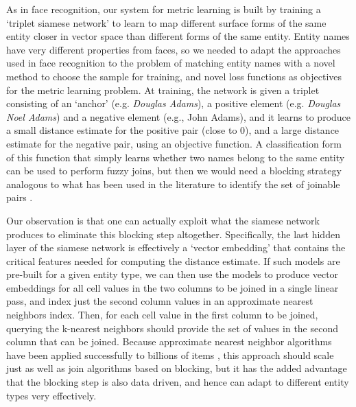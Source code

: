 As in face recognition, our system for metric learning is built by training a `triplet siamese network' to learn to map different surface forms of the same entity closer in vector space than different forms of the same entity.  Entity names have very different properties from faces, so we needed to adapt the approaches used in face recognition to the problem of matching entity names with a novel method to choose the sample for training, and novel loss functions as objectives for the metric learning problem.  At training, the network is given a triplet consisting of an `anchor' (e.g. \textit{Douglas Adams}), a positive element (e.g. \textit{Douglas Noel Adams}) and a negative element (e.g., John Adams), and it learns to produce a small distance estimate for the positive pair (close to 0), and a large distance estimate for the negative pair, using an objective function. A classification form of this function that simply learns whether two names belong to the same entity can be used to perform fuzzy joins, but then we would need a blocking strategy analogous to what has been used in the literature to identify the set of joinable pairs \cite{auto-join-joining-tables-leveraging-transformations}.  

Our observation is that one can actually exploit what the siamese network produces to eliminate this blocking step altogether.  Specifically, the last hidden layer of the siamese network is effectively a `vector embedding' that contains the critical features needed for computing the distance estimate.  If such models are pre-built for a given entity type, we can then use the models to produce vector embeddings for all cell values in the two columns to be joined in a single linear pass, and index just the second column values in an approximate nearest neighbors index.  Then, for each cell value in the first column to be joined, querying the k-nearest neighbors should provide the set of values in the second column that can be joined.  Because approximate nearest neighbor algorithms have been applied successfully to billions of items \cite{JDH17}, this approach should scale just as well as join algorithms based on blocking, but it has the added advantage that the blocking step is also data driven, and hence can adapt to different entity types very effectively.

